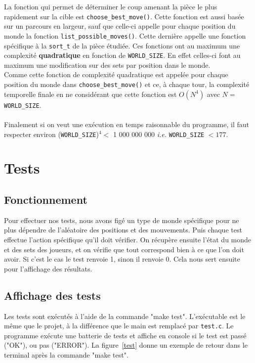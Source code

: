 \documentclass{article}
\begin{document}
La fonction qui permet de déterminer le coup amenant la pièce le plus rapidement sur la cible est \lstinline{choose_best_move()}.
Cette fonction est aussi basée sur un parcours en largeur, sauf que celle-ci appelle pour chaque position du monde la fonction \lstinline{list_possible_moves()}.
Cette dernière appelle une fonction spécifique à la \lstinline{sort_t} de la pièce étudiée.
Ces fonctions ont au maximum une complexité \textbf{quadratique} en fonction de \lstinline{WORLD_SIZE}.
En effet celles-ci font au maximum une modification sur des sets par position dans le monde.
\\
Comme cette fonction de complexité quadratique est appelée pour chaque position du monde dans \lstinline{choose_best_move()} et ce, à chaque tour, la complexité temporelle finale en ne considérant que cette fonction est $O(N^4)$ avec $N =$ \lstinline{WORLD_SIZE}.
\\\\
Finalement si on veut une exécution en temps raisonnable du programme, il faut respecter environ (\lstinline{WORLD_SIZE})$^4 <$ 1 000 000 000 \textit{i.e.} \lstinline{WORLD_SIZE} $< 177$.

\newpage
\section{Tests}
\subsection{Fonctionnement}
Pour effectuer nos tests, nous avons figé un type de monde spécifique pour ne plus dépendre de l'aléatoire des positions et des mouvements.
Puis chaque test effectue l'action spécifique qu'il doit vérifier. On récupère ensuite l'état du monde et des sets des joueurs, et on vérifie
que tout correspond bien à ce que l'on doit avoir. Si c'est le cas le test renvoie 1, sinon il renvoie 0. Cela nous sert ensuite pour l'affichage des résultats.

\vspace{2cm}
\subsection{Affichage des tests}
Les tests sont exécutés à l'aide de la commande "make test". L'exécutable est le même que le projet, à la différence que le main est remplacé par \lstinline{test.c}. Le programme exécute une batterie de tests et affiche en console si le test est passé ("OK"), ou pas ("ERROR"). La figure~\ref{test} donne un exemple de retour dans le terminal après la commande "make test".
\end{document}
